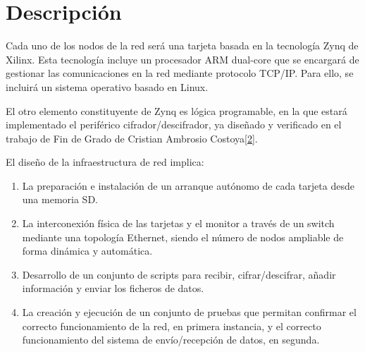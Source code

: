 \section{Descripción}
Cada uno de los nodos de la red será una tarjeta basada en la tecnología Zynq de Xilinx. Esta tecnología incluye un procesador ARM dual-core que se encargará de gestionar las
comunicaciones en la red mediante protocolo TCP/IP. Para ello, se incluirá un sistema operativo basado en Linux.

El otro elemento constituyente de Zynq es lógica programable, en la que estará implementado el periférico cifrador/descifrador, ya diseñado y verificado en el trabajo de Fin de Grado de Cristian Ambrosio Costoya\hyperlink{2}{[2]}.

El diseño de la infraestructura de red implica:
\begin{enumerate}
	\item La preparación e instalación de un arranque autónomo de cada tarjeta desde una memoria SD.
	\item La interconexión física de las tarjetas y el monitor a través de
	un switch mediante una topología Ethernet, siendo el número de nodos ampliable de forma dinámica y automática.
	\item Desarrollo de un conjunto de scripts para recibir, cifrar/descifrar, añadir información y enviar los ficheros de datos.
	\item La creación y ejecución de un conjunto de pruebas que permitan confirmar
	el correcto funcionamiento de la red, en primera instancia, y el correcto funcionamiento del sistema de envío/recepción de datos, en segunda.
\end{enumerate}